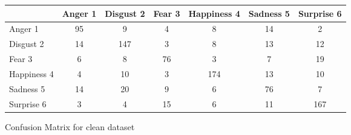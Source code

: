 \begin{figure}[h]
  \begin{center}
    \caption{Confusion Matrix for clean dataset}
    \begin{tabular}{ | l || c | c | c | c | c | c | }
    \hline
          & Anger 1 & Disgust 2 & Fear 3 & Happiness 4 & Sadness 5 & Surprise 6 \\ \hline \hline
        Anger 1 & 95 & 9 & 4 & 8 & 14 & 2 \\ \hline
        Disgust 2 & 14 & 147 & 3 & 8 & 13 & 12 \\ \hline
        Fear 3 & 6 & 8 & 76 & 3 & 7 & 19 \\ \hline
        Happiness 4 & 4 & 10 & 3 & 174 & 13 & 10 \\ \hline
        Sadness 5 & 14 & 20 & 9 & 6 & 76 & 7 \\ \hline
        Surprise 6 & 3 & 4 & 15 & 6 & 11 & 167 \\ \hline
    \end{tabular}
    \label{fig:confusionMatrix}
\end{center}
\end{figure}
